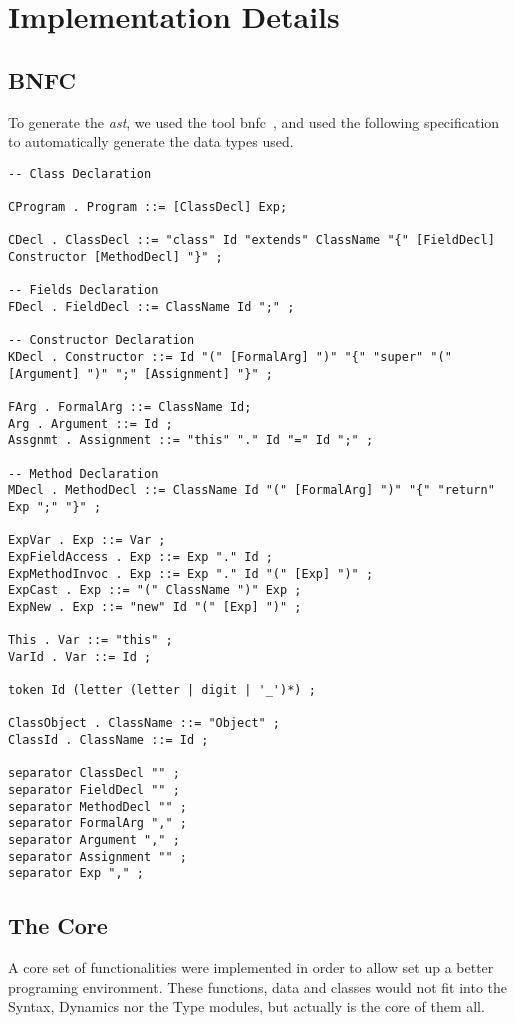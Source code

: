 \chapter{Implementation Details}
\section{BNFC}
To generate the \textit{ast}, we used the tool bnfc~\cite{bnfc}, and used the
following specification to automatically generate the data types used.

\begin{lstlisting}[frame=single]
-- Class Declaration

CProgram . Program ::= [ClassDecl] Exp;

CDecl . ClassDecl ::= "class" Id "extends" ClassName "{" [FieldDecl] Constructor [MethodDecl] "}" ;

-- Fields Declaration
FDecl . FieldDecl ::= ClassName Id ";" ;

-- Constructor Declaration
KDecl . Constructor ::= Id "(" [FormalArg] ")" "{" "super" "(" [Argument] ")" ";" [Assignment] "}" ;

FArg . FormalArg ::= ClassName Id;
Arg . Argument ::= Id ;
Assgnmt . Assignment ::= "this" "." Id "=" Id ";" ;

-- Method Declaration
MDecl . MethodDecl ::= ClassName Id "(" [FormalArg] ")" "{" "return" Exp ";" "}" ;

ExpVar . Exp ::= Var ;
ExpFieldAccess . Exp ::= Exp "." Id ; 
ExpMethodInvoc . Exp ::= Exp "." Id "(" [Exp] ")" ;
ExpCast . Exp ::= "(" ClassName ")" Exp ;
ExpNew . Exp ::= "new" Id "(" [Exp] ")" ;

This . Var ::= "this" ;
VarId . Var ::= Id ; 

token Id (letter (letter | digit | '_')*) ;

ClassObject . ClassName ::= "Object" ;
ClassId . ClassName ::= Id ;

separator ClassDecl "" ;
separator FieldDecl "" ;
separator MethodDecl "" ;
separator FormalArg "," ;
separator Argument "," ;
separator Assignment "" ;
separator Exp "," ;
\end{lstlisting}

\section{The Core}
A core set of functionalities were implemented in order to allow set up a
better programing environment. These functions, data and classes would not fit
into the Syntax, Dynamics nor the Type modules, but actually is the core of them all.

